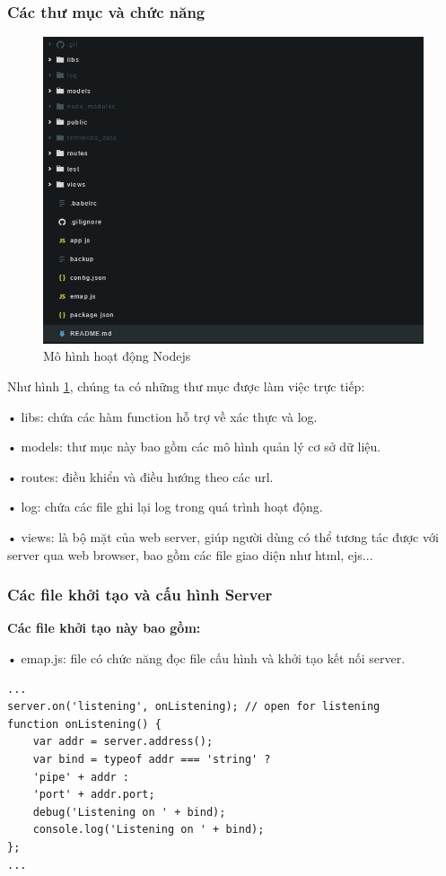 \subsubsection*{Các thư mục và chức năng}
\begin{figure}[H]
	\centering    
	\includegraphics[width=1.0\textwidth]{tree}
	\caption[Mô hình hoạt động Nodejs]{Mô hình hoạt động Nodejs}
	\label{fig: tree}
\end{figure}
Như hình \ref{fig: tree}, chúng ta có những thư mục được làm việc trực tiếp:

• libs: chứa các hàm function hỗ trợ về xác thực và log.

• models: thư mục này bao gồm các mô hình quản lý cơ sở dữ liệu.

• routes: điều khiển và điều hướng theo các url.

• log: chứa các file ghi lại log trong quá trình hoạt động.

• views: là bộ mặt của web server, giúp người dùng có thể tương tác được với server qua web browser, bao gồm các file giao diện như html, ejs...   


\subsubsection*{Các file khởi tạo và cấu hình Server}

\textbf{Các file khởi tạo này bao gồm:}

• emap.js: file có chức năng đọc file cấu hình và khởi tạo kết nối server.
\begin{lstlisting}[caption=emap.js]
...
server.on('listening', onListening); // open for listening
function onListening() {
	var addr = server.address();
	var bind = typeof addr === 'string' ?
	'pipe' + addr :
	'port' + addr.port;
	debug('Listening on ' + bind);
	console.log('Listening on ' + bind);
};
...
\end{lstlisting}

